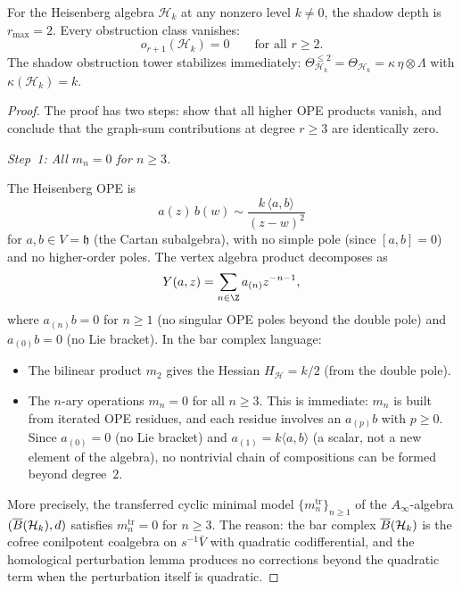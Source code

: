 \begin{theorem}[$r_{\max}(\mathcal{H}_k) = 2$; \ClaimStatusProvedHere]
\label{thm:gaussian-rmax-two}
For the Heisenberg algebra $\mathcal{H}_k$ at any nonzero
level $k \neq 0$, the shadow depth is $r_{\max} = 2$.
Every obstruction class vanishes:
\begin{equation}\label{eq:gaussian-all-obstructions-vanish}
o_{r+1}(\mathcal{H}_k) = 0
\qquad \text{for all } r \geq 2.
\end{equation}
The shadow obstruction tower stabilizes immediately:
$\Theta_{\mathcal{H}_k}^{\leq 2} = \Theta_{\mathcal{H}_k}
= \kappa\,\eta \otimes \Lambda$ with $\kappa(\mathcal{H}_k) = k$.
\end{theorem}

\begin{proof}
The proof has two steps: show that all higher OPE products
vanish, and conclude that the graph-sum contributions
at degree $r \geq 3$ are identically zero.

\medskip
\emph{Step~1: All $m_n = 0$ for $n \geq 3$.}

The Heisenberg OPE is
\begin{equation}\label{eq:heisenberg-ope-recall}
a(z)\,b(w) \sim \frac{k\,\langle a, b \rangle}{(z-w)^2}
\end{equation}
for $a, b \in V = \mathfrak{h}$ (the Cartan subalgebra),
with no simple pole (since $[a,b] = 0$) and no
higher-order poles. The vertex algebra product decomposes
as
\[
Y(a, z) = \sum_{n \in \Z} a_{(n)} z^{-n-1},
\]
where $a_{(n)}b = 0$ for $n \geq 1$ (no singular OPE
poles beyond the double pole) and $a_{(0)}b = 0$
(no Lie bracket). In the bar complex language:
\begin{itemize}
\item The bilinear product $m_2$ gives the Hessian
 $H_{\mathcal{H}} = k/2$ (from the double pole).
\item The $n$-ary operations $m_n = 0$ for all $n \geq 3$.
 This is immediate: $m_n$ is built from
 iterated OPE residues, and each residue involves an
 $a_{(p)}b$ with $p \geq 0$. Since $a_{(0)} = 0$
 (no Lie bracket) and $a_{(1)} = k\langle a, b\rangle$
 (a scalar, not a new element of the algebra), no
 nontrivial chain of compositions can be formed beyond
 degree~$2$.
\end{itemize}

More precisely, the transferred cyclic minimal model
$\{m_n^{\mathrm{tr}}\}_{n \geq 1}$ of the
$A_\infty$-algebra $(\overline{B}(\mathcal{H}_k), d)$ satisfies
$m_n^{\mathrm{tr}} = 0$ for $n \geq 3$. The reason: the
bar complex $\overline{B}(\mathcal{H}_k)$ is the cofree
conilpotent coalgebra on $s^{-1}\bar{V}$ with quadratic
codifferential, and the homological perturbation lemma
produces no corrections beyond the quadratic term when the
perturbation itself is quadratic.


\end{proof}
